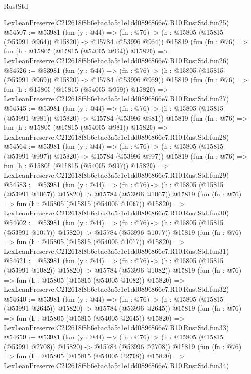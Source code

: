 \begin{lexlean}{RustStd}
\begin{coremodule}
    LexLeanPreserve.C212618f8b6ebac3a5c1e1dd0896866e7.R10.RustStd.fun25)
@54507 := @53981
    (fun (y : @44) =>
    (fn : @76) -> (h : @15805 (@15815 (@53991 @964)) @15820) -> @15784 (@53996 @964))
    @15819
    (fun (fn : @76) =>
    fun (h : @15805 (@15815 (@54005 @964)) @15820) =>
    LexLeanPreserve.C212618f8b6ebac3a5c1e1dd0896866e7.R10.RustStd.fun26)
@54526 := @53981
    (fun (y : @44) =>
    (fn : @76) -> (h : @15805 (@15815 (@53991 @969)) @15820) -> @15784 (@53996 @969))
    @15819
    (fun (fn : @76) =>
    fun (h : @15805 (@15815 (@54005 @969)) @15820) =>
    LexLeanPreserve.C212618f8b6ebac3a5c1e1dd0896866e7.R10.RustStd.fun27)
@54545 := @53981
    (fun (y : @44) =>
    (fn : @76) -> (h : @15805 (@15815 (@53991 @981)) @15820) -> @15784 (@53996 @981))
    @15819
    (fun (fn : @76) =>
    fun (h : @15805 (@15815 (@54005 @981)) @15820) =>
    LexLeanPreserve.C212618f8b6ebac3a5c1e1dd0896866e7.R10.RustStd.fun28)
@54564 := @53981
    (fun (y : @44) =>
    (fn : @76) -> (h : @15805 (@15815 (@53991 @997)) @15820) -> @15784 (@53996 @997))
    @15819
    (fun (fn : @76) =>
    fun (h : @15805 (@15815 (@54005 @997)) @15820) =>
    LexLeanPreserve.C212618f8b6ebac3a5c1e1dd0896866e7.R10.RustStd.fun29)
@54583 := @53981
    (fun (y : @44) =>
    (fn : @76) -> (h : @15805 (@15815 (@53991 @1067)) @15820) -> @15784 (@53996 @1067))
    @15819
    (fun (fn : @76) =>
    fun (h : @15805 (@15815 (@54005 @1067)) @15820) =>
    LexLeanPreserve.C212618f8b6ebac3a5c1e1dd0896866e7.R10.RustStd.fun30)
@54602 := @53981
    (fun (y : @44) =>
    (fn : @76) -> (h : @15805 (@15815 (@53991 @1077)) @15820) -> @15784 (@53996 @1077))
    @15819
    (fun (fn : @76) =>
    fun (h : @15805 (@15815 (@54005 @1077)) @15820) =>
    LexLeanPreserve.C212618f8b6ebac3a5c1e1dd0896866e7.R10.RustStd.fun31)
@54621 := @53981
    (fun (y : @44) =>
    (fn : @76) -> (h : @15805 (@15815 (@53991 @1082)) @15820) -> @15784 (@53996 @1082))
    @15819
    (fun (fn : @76) =>
    fun (h : @15805 (@15815 (@54005 @1082)) @15820) =>
    LexLeanPreserve.C212618f8b6ebac3a5c1e1dd0896866e7.R10.RustStd.fun32)
@54640 := @53981
    (fun (y : @44) =>
    (fn : @76) -> (h : @15805 (@15815 (@53991 @2645)) @15820) -> @15784 (@53996 @2645))
    @15819
    (fun (fn : @76) =>
    fun (h : @15805 (@15815 (@54005 @2645)) @15820) =>
    LexLeanPreserve.C212618f8b6ebac3a5c1e1dd0896866e7.R10.RustStd.fun33)
@54659 := @53981
    (fun (y : @44) =>
    (fn : @76) -> (h : @15805 (@15815 (@53991 @2708)) @15820) -> @15784 (@53996 @2708))
    @15819
    (fun (fn : @76) =>
    fun (h : @15805 (@15815 (@54005 @2708)) @15820) =>
    LexLeanPreserve.C212618f8b6ebac3a5c1e1dd0896866e7.R10.RustStd.fun34)

\end{coremodule}
\end{lexlean}
